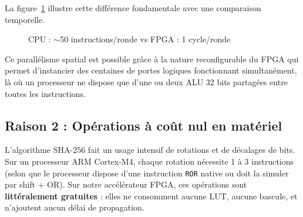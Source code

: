 La figure~\ref{fig:cpu_vs_fpga} illustre cette différence fondamentale avec une comparaison temporelle.

\begin{figure}[H]
\centering
{}
\caption{CPU : $\sim$50 instructions/ronde vs FPGA : 1 cycle/ronde}
\label{fig:cpu_vs_fpga}
\end{figure}

Ce parallélisme spatial est possible grâce à la nature reconfigurable du FPGA qui permet d'instancier des centaines de portes logiques fonctionnant simultanément, là où un processeur ne dispose que d'une ou deux ALU 32 bits partagées entre toutes les instructions.

\subsection{Raison 2 : Opérations à coût nul en matériel}

L'algorithme SHA-256 fait un usage intensif de rotations et de décalages de bits. Sur un processeur ARM Cortex-M4, chaque rotation nécessite 1 à 3 instructions (selon que le processeur dispose d'une instruction \texttt{ROR} native ou doit la simuler par shift + OR). Sur notre accélérateur FPGA, ces opérations sont \textbf{littéralement gratuites} : elles ne consomment aucune LUT, aucune bascule, et n'ajoutent aucun délai de propagation.


